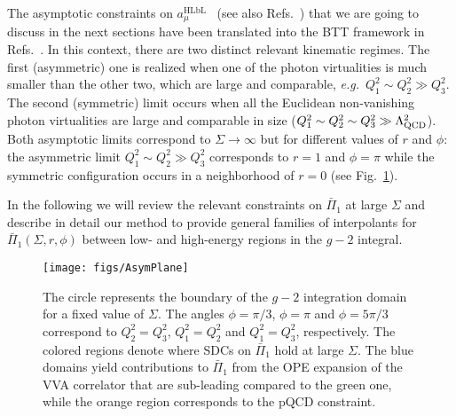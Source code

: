 The asymptotic constraints on $a_\mu^\text{HLbL}$~\cite{MV,Bijnens}  (see also Refs.~\cite{Knecht:2020xyr,Masjuan:2020jsf}) that we are going to discuss in the next sections have been translated into the BTT framework in Refs.~\cite{Bijnens,BernSDCShort,BernSDCLong}.
In this context, there are two distinct relevant kinematic regimes. The first (asymmetric) one is realized when one of the photon virtualities is much smaller than the other two, which are large and comparable, {\it e.g.}\ $Q_1^2 \sim Q_2^2 \gg Q_3^2$. The second (symmetric) limit occurs when all the Euclidean non-vanishing photon virtualities are large and comparable in size ($Q_1^2 \sim Q_2^2 \sim Q_3^2 \gg \Lambda_\text{QCD}^2 $). Both asymptotic limits correspond to $\Sigma \to \infty$ but for different values of $r$ and $\phi$: the asymmetric limit $Q_1^2 \sim Q_2^2 \gg Q_3^2$ corresponds to $r=1$ and $\phi = \pi$ while the symmetric configuration occurs in a neighborhood of $r=0$ (see Fig.~\ref{Fig:patches}). 

In the following we will review the relevant constraints on $\bar{\Pi}_1$ at large $\Sigma$ and describe in detail our method to provide general families of interpolants for $\bar{\Pi}_1(\Sigma, r, \phi)$ between low- and high-energy regions in the $g-2$ integral.

\begin{figure}
	\centering
	\texttt{[image: figs/AsymPlane]}
	
	\caption{The circle represents the boundary of the $g-2$ integration domain for a fixed value of $\Sigma$. The angles $\phi = \pi/3$, $\phi = \pi$ and $\phi=5 \pi/3$ correspond to $Q_2^2= Q_3^2$, $Q_1^2 = Q_2^2$ and $Q_1^2=Q_3^2$, respectively. The colored regions denote where SDCs on $\bar{\Pi}_1$ hold at large $\Sigma$. The blue domains yield contributions to $\bar{\Pi}_1$ from the OPE expansion of the VVA correlator that are sub-leading compared to the green one, while the orange region corresponds to the pQCD constraint.}
	\label{Fig:patches}
\end{figure}


